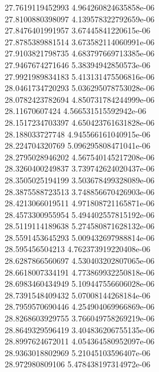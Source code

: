 {27.7619119452993 4.964260824635858e-06 \\
27.8100880398097 4.139578322792659e-06 \\
27.8476401991957 3.67445841220615e-06 \\
27.8785389881514 3.673582114060991e-06 \\
27.9103821798735 4.683797669713385e-06 \\
27.9467674271646 5.38394942850573e-06 \\
27.9921989834183 5.413131475506816e-06 \\
28.0461734720293 5.036295078753028e-06 \\
28.0782423782694 4.850731784244999e-06 \\
28.11670607424 4.566531515592942e-06 \\
28.1517234703397 4.650423761631828e-06 \\
28.188033727748 4.945566161040915e-06 \\
28.224704320769 5.096295808471041e-06 \\
28.2795028946202 4.567540145217208e-06 \\
28.3260400249837 3.739742624020437e-06 \\
28.3505025194199 3.503678499328089e-06 \\
28.3875588723513 3.748856670426903e-06 \\
28.4213066019511 4.971808721165871e-06 \\
28.4573300955954 5.494402557815192e-06 \\
28.5119114189638 5.274580871628132e-06 \\
28.5591453645293 5.009432697988814e-06 \\
28.595456504213 4.762373919220408e-06 \\
28.6287866560697 4.530403202807065e-06 \\
28.6618007334191 4.773869932250818e-06 \\
28.6983460434949 5.109447556606028e-06 \\
28.7391548409432 5.07008144268184e-06 \\
28.7959570690446 4.254904069966869e-06 \\
28.8268603929755 3.766049758269219e-06 \\
28.8649329596419 3.404836206755135e-06 \\
28.8997624672011 4.054364580952097e-06 \\
28.9363018802969 5.21045103596407e-06 \\
28.972980809106 5.478438197314972e-06 \\
}
